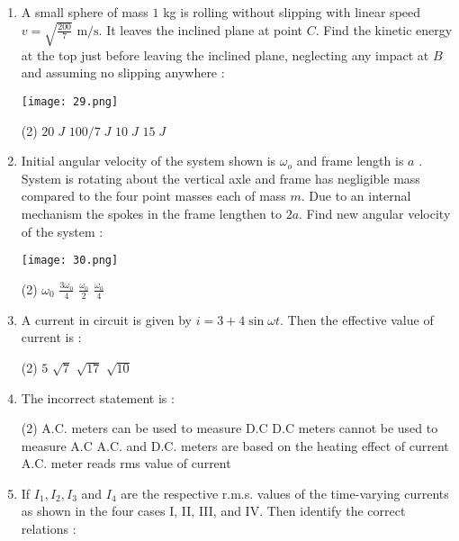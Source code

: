 \documentclass{article}
\begin{document}
\begin{enumerate}
\texttt{[image: 28.png]}

\begin{tasks}(2)
\task \(v\)
\task \(v\cos\theta\)
\task \(\sqrt{2}v\)
\task \(v\sec\theta \)
\end{tasks}
\item A small sphere of mass \( 1 \) kg is rolling without slipping with linear speed \( v =\displaystyle \sqrt{\frac{200}{7}} \text{ m/s}.\) It leaves the inclined plane at point \( C \). Find the kinetic energy at the top just before leaving the inclined plane, neglecting any impact at \( B \) and assuming no slipping anywhere :

\texttt{[image: 29.png]}

\begin{tasks}(2)
\task \(20\;J\)
\task \(100/7\;J\)
\task \(10\;J\)
\task \(15\;J\)
\end{tasks}
\item Initial angular velocity of the system shown is \(\omega_o\) and frame length is \(a\) . System is rotating about the vertical axle and frame has negligible mass compared to the four point masses each of mass \(m\). Due to an internal mechanism the spokes in the frame lengthen to \(2a\). Find new angular velocity of the system :

\texttt{[image: 30.png]}

\begin{tasks}(2)
\task \( \displaystyle\omega_0 \)
\task \( \displaystyle\frac{3\omega_0}{4} \)
\task \( \displaystyle\frac{\omega_0}{2} \)
\task \( \displaystyle\frac{\omega_0}{4} \)
\end{tasks}
\item A current in circuit is given by \( i = 3 + 4 \sin \omega t \). Then the effective value of current is :
\begin{tasks}(2)
\task \( 5 \)
\task \( \sqrt{7} \)
\task \( \sqrt{17} \)
\task \( \sqrt{10} \)
\end{tasks}
\item The incorrect statement is :
\begin{tasks}(2)
\task A.C. meters can be used to measure D.C
\task D.C meters cannot be used to measure A.C
\task A.C. and D.C. meters are based on the heating effect of current
\task A.C. meter reads rms value of current
\end{tasks}
\item If \( I_1, I_2, I_3 \) and \( I_4 \) are the respective r.m.s. values of the time-varying currents as shown in the four cases I, II, III, and IV. Then identify the correct relations :


\end{enumerate}
\end{document}

